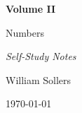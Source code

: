 \begin{titlepage}
\centering

\vspace*{5cm}

{\Huge\bfseries Volume II\par}

\vspace{0.5cm}

{\LARGE Numbers\par}

\vspace{0.5cm}

{\large\itshape Self-Study Notes\par}

\vfill

{\large William Sollers\par}

\vspace{0.5cm}

{\large \today\par}

\end{titlepage}